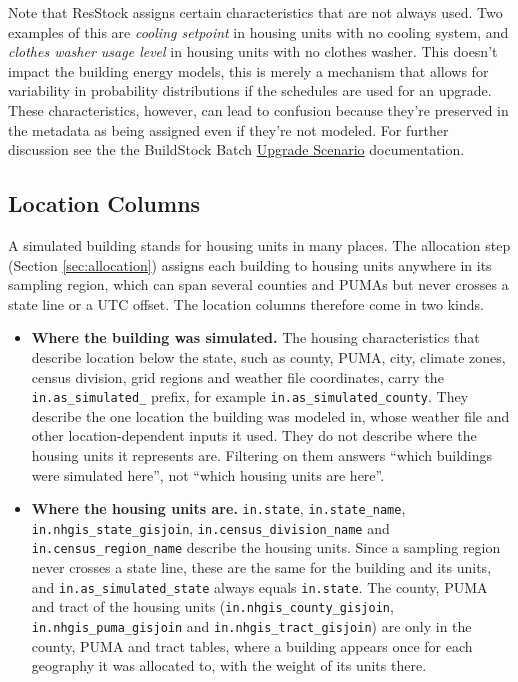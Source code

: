 Note that ResStock assigns certain characteristics that are not always used. Two examples of this are \textit{cooling setpoint} in housing units with no cooling system, and \textit{clothes washer usage level} in housing units with no clothes washer. This doesn't impact the building energy models, this is merely a mechanism that allows for variability in probability distributions if the schedules are used for an upgrade. These characteristics, however, can lead to confusion because they're preserved in the metadata as being assigned even if they're not modeled. For further discussion see the the BuildStock Batch \href{https://buildstockbatch.readthedocs.io/en/v2023.10.0/project_defn.html#upgrade-scenarios}{Upgrade Scenario} documentation.

\subsection{Location Columns}\label{sec:output_location_columns}
A simulated building stands for housing units in many places. The allocation step (Section \ref{sec:allocation}) assigns each building to housing units anywhere in its sampling region, which can span several counties and PUMAs but never crosses a state line or a UTC offset. The location columns therefore come in two kinds.

\begin{itemize}
    \item \textbf{Where the building was simulated.} The housing characteristics that describe location below the state, such as county, PUMA, city, climate zones, census division, grid regions and weather file coordinates, carry the \texttt{in.as\_simulated\_} prefix, for example \texttt{in.as\_simulated\_county}. They describe the one location the building was modeled in, whose weather file and other location-dependent inputs it used. They do not describe where the housing units it represents are. Filtering on them answers ``which buildings were simulated here'', not ``which housing units are here''.
    \item \textbf{Where the housing units are.} \texttt{in.state}, \texttt{in.state\_name}, \texttt{in.nhgis\_state\_gisjoin}, \texttt{in.census\_division\_name} and \texttt{in.census\_region\_name} describe the housing units. Since a sampling region never crosses a state line, these are the same for the building and its units, and \texttt{in.as\_simulated\_state} always equals \texttt{in.state}. The county, PUMA and tract of the housing units (\texttt{in.nhgis\_county\_gisjoin}, \texttt{in.nhgis\_puma\_gisjoin} and \texttt{in.nhgis\_tract\_gisjoin}) are only in the county, PUMA and tract tables, where a building appears once for each geography it was allocated to, with the weight of its units there.
\end{itemize}

